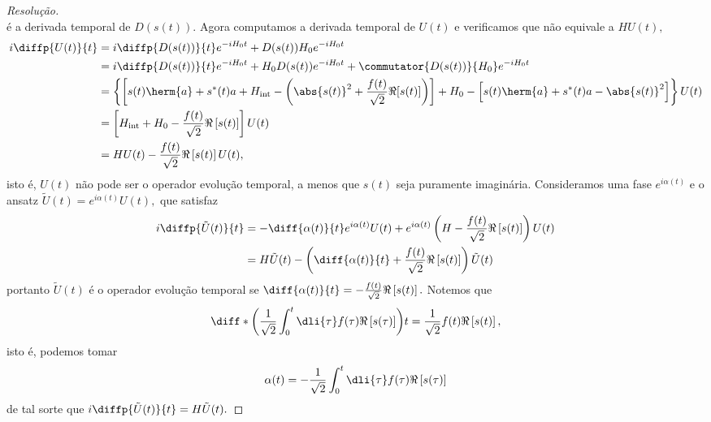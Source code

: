 \begin{proof}[Resolução]
\begin{equation*}
   \end{equation*}
   é a derivada temporal de \(D(s(t)).\) Agora computamos a derivada temporal de \(U(t)\) e verificamos que não equivale a \(H U(t),\)
   \begin{align*}
      i\diffp{U(t)}{t} &= i\diffp{D(s(t))}{t} e^{-i H_0 t} + D(s(t)) H_0e^{-i H_0t}\\
                       &= i \diffp{D(s(t))}{t} e^{-iH_0t} + H_0 D(s(t))e^{-iH_0 t} + \commutator{D(s(t))}{H_0} e^{-iH_0 t}\\
                       &= \left\{\left[s(t) \herm{a} + s^*(t)a + H_\mathrm{int} - \left(\abs{s(t)}^2 + \frac{f(t)}{\sqrt{2}} \Re[s(t)]\right)\right] + H_0 - \left[s(t) \herm{a} + s^*(t) a - \abs{s(t)}^2\right]\right\}U(t)\\
                       &= \left[H_\mathrm{int} + H_0 - \frac{f(t)}{\sqrt{2}} \Re\left[s(t)\right]\right] U(t)\\
                       &= H U(t) - \frac{f(t)}{\sqrt{2}} \Re\left[s(t)\right]U(t),
   \end{align*}
   isto é, \(U(t)\) não pode ser o operador evolução temporal, a menos que \(s(t)\) seja puramente imaginária. Consideramos uma fase \(e^{i\alpha(t)}\) e o ansatz \(\tilde{U}(t) = e^{i \alpha(t)} U(t),\) que satisfaz
   \begin{align*}
      i\diffp{\tilde{U}(t)}{t} &= - \diff{\alpha(t)}{t} e^{i \alpha(t)} U(t) + e^{i \alpha(t)} \left(H - \frac{f(t)}{\sqrt{2}}\Re\left[s(t)\right]\right)U(t)\\
                               &= H \tilde{U}(t) - \left(\diff{\alpha(t)}{t} + \frac{f(t)}{\sqrt{2}}\Re\left[s(t)\right]\right) \tilde{U}(t)
   \end{align*}
   portanto \(\tilde{U}(t)\) é o operador evolução temporal se \(\diff{\alpha(t)}{t} = - \frac{f(t)}{\sqrt{2}}\Re\left[s(t)\right].\) Notemos que
   \begin{equation*}
      \diff*{\left(\frac1{\sqrt{2}} \int_0^t \dli{\tau} f(\tau) \Re\left[s(\tau)\right]\right)}{t} 
      = \frac{1}{\sqrt{2}} f(t) \Re\left[s(t)\right],
   \end{equation*}
   isto é, podemos tomar 
   \begin{equation*}
      \alpha(t) = - \frac{1}{\sqrt{2}} \int_0^t \dli{\tau} f(\tau) \Re\left[s(\tau)\right]
   \end{equation*}
   de tal sorte que \(i \diffp{\tilde{U}(t)}{t} = H \tilde{U}(t).\)
\end{proof}
